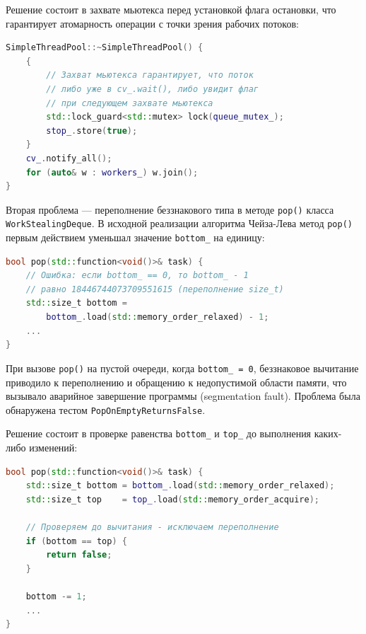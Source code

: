 Решение состоит в захвате мьютекса перед установкой флага
остановки, что гарантирует атомарность операции с точки зрения
рабочих потоков:

\begin{lstlisting}[language=C++,
                   caption={Исправленная реализация деструктора},
                   label={lst:destructor-fix}]
SimpleThreadPool::~SimpleThreadPool() {
    {
        // Захват мьютекса гарантирует, что поток
        // либо уже в cv_.wait(), либо увидит флаг
        // при следующем захвате мьютекса
        std::lock_guard<std::mutex> lock(queue_mutex_);
        stop_.store(true);
    }
    cv_.notify_all();
    for (auto& w : workers_) w.join();
}
\end{lstlisting}

Вторая проблема --- переполнение беззнакового типа в методе
\texttt{pop()} класса \texttt{WorkStealingDeque}. В исходной
реализации алгоритма Чейза-Лева метод \texttt{pop()} первым
действием уменьшал значение \texttt{bottom\_} на единицу:

\begin{lstlisting}[language=C++,
                   caption={Ошибка переполнения в методе pop()},
                   label={lst:pop-bug}]
bool pop(std::function<void()>& task) {
    // Ошибка: если bottom_ == 0, то bottom_ - 1
    // равно 18446744073709551615 (переполнение size_t)
    std::size_t bottom =
        bottom_.load(std::memory_order_relaxed) - 1;
    ...
}
\end{lstlisting}

При вызове \texttt{pop()} на пустой очереди, когда
\texttt{bottom\_\,=\,0}, беззнаковое вычитание приводило
к переполнению и обращению к недопустимой области памяти,
что вызывало аварийное завершение программы (segmentation fault).
Проблема была обнаружена тестом \texttt{PopOnEmptyReturnsFalse}.

Решение состоит в проверке равенства \texttt{bottom\_} и
\texttt{top\_} до выполнения каких-либо изменений:

\begin{lstlisting}[language=C++,
                   caption={Исправленный метод pop()},
                   label={lst:pop-fix}]
bool pop(std::function<void()>& task) {
    std::size_t bottom = bottom_.load(std::memory_order_relaxed);
    std::size_t top    = top_.load(std::memory_order_acquire);

    // Проверяем до вычитания - исключаем переполнение
    if (bottom == top) {
        return false;
    }

    bottom -= 1;
    ...
}
\end{lstlisting}

